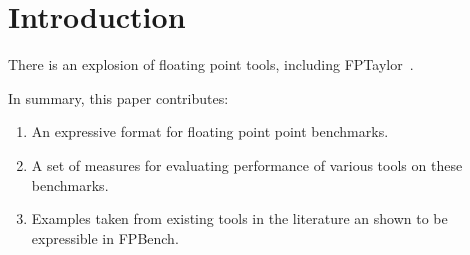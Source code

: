 \section{Introduction}
\label{sec:intro}

There is an explosion of floating point tools, including
FPTaylor~\cite{fptaylor-fm15}.

In summary, this paper contributes:
%
\begin{enumerate}
%
  \item An expressive format for floating point point benchmarks.
%
  \item A set of measures for evaluating performance of various tools on
  these benchmarks.
%
  \item Examples taken from existing tools in the literature an shown to be
  expressible in FPBench.
%
\end{enumerate}

